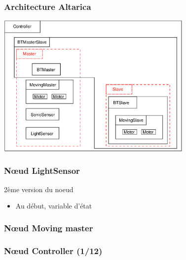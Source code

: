  \begin{frame}
  \frametitle{Architecture Altarica}
  \center
  \includegraphics[height=7cm]{ARmodel.eps}

 \end{frame}
 
 
 \begin{frame}
  \frametitle{N\oe{}ud LightSensor}

  \begin{block}{2ème version du noeud}
   
  \end{block}
  
  \begin{block}{}
   \begin{itemize}
    \item Au début, variable d'état
   \end{itemize}
  \end{block}

 \end{frame}
 
  \begin{frame}
  \frametitle{N\oe{}ud Moving master}

    \begin{block}{}
    
    \end{block}

  \end{frame}

  \begin{frame}
   \frametitle{N\oe{}ud Controller (1/12)}
   
       
  \end{frame}

